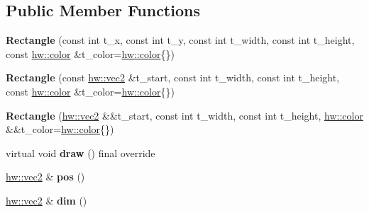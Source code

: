 \subsection*{Public Member Functions}
\begin{DoxyCompactItemize}
\item 
\mbox{\label{classdummy__api_1_1Rectangle_ae742d15d2aeb5d46a76ed7e8144881a4}} 
{\bfseries Rectangle} (const int t\+\_\+x, const int t\+\_\+y, const int t\+\_\+width, const int t\+\_\+height, const \mbox{\hyperlink{structhw_1_1color}{hw\+::color}} \&t\+\_\+color=\mbox{\hyperlink{structhw_1_1color}{hw\+::color}}\{\})
\item 
\mbox{\label{classdummy__api_1_1Rectangle_ac04d41f0f59ef9b54234097cdd605ed0}} 
{\bfseries Rectangle} (const \mbox{\hyperlink{structhw_1_1vec2}{hw\+::vec2}} \&t\+\_\+start, const int t\+\_\+width, const int t\+\_\+height, const \mbox{\hyperlink{structhw_1_1color}{hw\+::color}} \&t\+\_\+color=\mbox{\hyperlink{structhw_1_1color}{hw\+::color}}\{\})
\item 
\mbox{\label{classdummy__api_1_1Rectangle_a3961541dc017bac9c971951ae5744900}} 
{\bfseries Rectangle} (\mbox{\hyperlink{structhw_1_1vec2}{hw\+::vec2}} \&\&t\+\_\+start, const int t\+\_\+width, const int t\+\_\+height, \mbox{\hyperlink{structhw_1_1color}{hw\+::color}} \&\&t\+\_\+color=\mbox{\hyperlink{structhw_1_1color}{hw\+::color}}\{\})
\item 
\mbox{\label{classdummy__api_1_1Rectangle_adc27348ec067f12c7b93cbbe4d2601ea}} 
virtual void {\bfseries draw} () final override
\item 
\mbox{\label{classdummy__api_1_1Rectangle_a02cd97bb02f82d70a9f8b7527ec2a5d8}} 
\mbox{\hyperlink{structhw_1_1vec2}{hw\+::vec2}} \& {\bfseries pos} ()
\item 
\mbox{\label{classdummy__api_1_1Rectangle_a2e5d7fd192952864dcd9b20c6b457e0d}} 
\mbox{\hyperlink{structhw_1_1vec2}{hw\+::vec2}} \& {\bfseries dim} ()
\item 
\mbox{\label{classdummy__api_1_1Rectangle_a39002d1b8602b2c36ee41ffe16b7ac95}} 

\end{DoxyCompactItemize}
